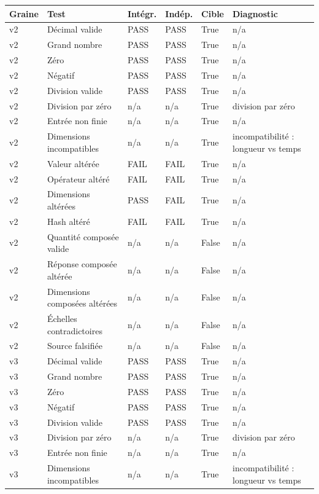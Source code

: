 \documentclass[11pt,a4paper]{article}
\begin{document}
\scriptsize\setlength{\tabcolsep}{1.4pt}
\begin{longtable}{p{}p{}p{}p{}p{}p{}}
\toprule Graine & Test & Intégr. & Indép. & Cible & Diagnostic \\
\midrule

v2 & Décimal valide & PASS & PASS & True & n/a \\
v2 & Grand nombre & PASS & PASS & True & n/a \\
v2 & Zéro & PASS & PASS & True & n/a \\
v2 & Négatif & PASS & PASS & True & n/a \\
v2 & Division valide & PASS & PASS & True & n/a \\
v2 & Division par zéro & n/a & n/a & True & division par zéro \\
v2 & Entrée non finie & n/a & n/a & True & n/a \\
v2 & Dimensions incompatibles & n/a & n/a & True & incompatibilité : longueur vs temps \\
v2 & Valeur altérée & FAIL & FAIL & True & n/a \\
v2 & Opérateur altéré & FAIL & FAIL & True & n/a \\
v2 & Dimensions altérées & PASS & FAIL & True & n/a \\
v2 & Hash altéré & FAIL & FAIL & True & n/a \\
v2 & Quantité composée valide & n/a & n/a & False & n/a \\
v2 & Réponse composée altérée & n/a & n/a & False & n/a \\
v2 & Dimensions composées altérées & n/a & n/a & False & n/a \\
v2 & Échelles contradictoires & n/a & n/a & False & n/a \\
v2 & Source falsifiée & n/a & n/a & False & n/a \\
v3 & Décimal valide & PASS & PASS & True & n/a \\
v3 & Grand nombre & PASS & PASS & True & n/a \\
v3 & Zéro & PASS & PASS & True & n/a \\
v3 & Négatif & PASS & PASS & True & n/a \\
v3 & Division valide & PASS & PASS & True & n/a \\
v3 & Division par zéro & n/a & n/a & True & division par zéro \\
v3 & Entrée non finie & n/a & n/a & True & n/a \\
v3 & Dimensions incompatibles & n/a & n/a & True & incompatibilité : longueur vs temps \\

\end{longtable}
\end{document}
